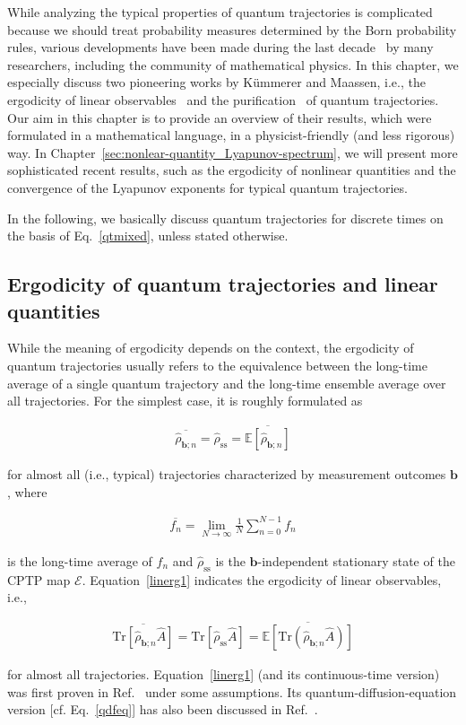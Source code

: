 \documentclass[preprint,pteplogo]{ptephy_v2}%
\numberwithin{equation}{section}
\theoremstyle{definition}
\newcommand{\ml}[1]{\mathcal{#1}}
\newcommand{\mr}[1]{\mathrm{#1}}
\newcommand{\aln}[1]{
\begin{align}
#1
\end{align}
}
\newcommand{\ra}{\rightarrow}
\newcommand{\Tr}{\mr{Tr}}
\begin{document}
While analyzing the typical properties of quantum trajectories is complicated because we should treat probability measures determined by the Born probability rules, various developments have been made during the last decade~\cite{attal2015central, benoist2019invariant, carollo2019unraveling, bernard2021can, benoist2021invariant, benoist2023limit, tindall2023generality, girotti2023concentration, benoist2024quantum} by many researchers, including the community of mathematical physics.
In this chapter, we especially discuss two pioneering works by K\"ummerer and Maassen, i.e., the ergodicity of linear observables~\cite{kummerer2004pathwise, kummerer2005quantum} and the purification~\cite{maassen2006purification} of quantum trajectories.
Our aim in this chapter is to provide an overview of their results, which were formulated in a mathematical language, in a physicist-friendly (and less rigorous) way.
In Chapter~\ref{sec:nonlear-quantity_Lyapunov-spectrum}, we will present more sophisticated recent results, such as the ergodicity of nonlinear quantities and the convergence of the Lyapunov exponents for typical quantum trajectories.

In the following, we basically discuss quantum trajectories for discrete times on the basis of Eq.~\eqref{qtmixed}, unless stated otherwise.


\subsection{Ergodicity of quantum trajectories and linear quantities}
\label{sec:ergodicity_linear-observable}
While the meaning of ergodicity depends on the context, the ergodicity of quantum trajectories usually refers to the equivalence between the long-time average of a single quantum trajectory and the long-time ensemble average over all trajectories.
For the simplest case, it is roughly formulated as
\aln{\label{linerg1}
\overline{\hat{\rho}_{\bm{b};n}}= \hat{\rho}_\mr{ss}
=\overline{\mathbb{E}\left[\hat{\rho}_{\bm{b};n}\right]}
}
for almost all (i.e., typical) trajectories characterized by measurement outcomes $\bm{b}$, where
\aln{\label{eq:time-average}
\overline{f_n}=\lim_{N\ra \infty}\frac{1}{N}\sum_{n=0}^{N-1}f_n
}
is the long-time average of $f_n$ and $\hat{\rho}_\mr{ss}$ is the $\bm{b}$-independent stationary state of the CPTP map $\ml{E}$.
Equation~\eqref{linerg1} indicates the ergodicity of linear observables, i.e., 
\aln{\label{linerg2}
\overline{\Tr[\hat{\rho}_{\bm{b};n}\hat{A}]}=\Tr[\hat{\rho}_\mr{ss}\hat{A}]
=\overline{\mathbb{E}\left[\Tr(\hat{\rho}_{\bm{b};n}\hat{A})\right]}}
for almost all trajectories.
Equation~\eqref{linerg1} (and its continuous-time version) was first proven in Ref.~\cite{kummerer2004pathwise} under some assumptions.
Its quantum-diffusion-equation version [cf. Eq.~\eqref{qdfeq}] has also been discussed in Ref.~\cite{benoist2021invariant}.
\end{document}
